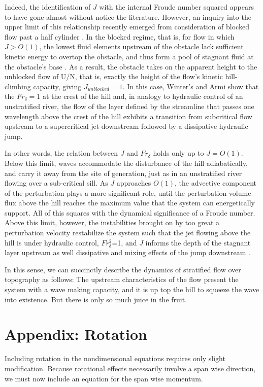 \documentclass[12pt]{article}
\begin{document}
	Indeed, the identification of $J$ with the internal Froude number squared appears to have gone almost without notice the literature. However, an inquiry into the upper limit of this relationship recently emerged from consideration of blocked flow past a half cylinder \citep{Winters2012}. In the blocked regime, that is, for flow in which $J>O(1)$, the lowest fluid elements upstream of the obstacle lack sufficient kinetic energy to overtop the obstacle, and thus form a pool of stagnant fluid at the obstacle's base \citep{Baines1995}. As a result, the obstacle takes on the apparent height to the unblocked flow of U/N, that is, exactly the height of the flow's kinetic hill-climbing capacity, giving $J_{unblocked}=1$. In this case, Winter's and Armi show that the $Fr_{\delta}=1$ at the crest of the hill and, in analogy to hydraulic control of an unstratified river, the flow of the layer defined by the streamline that passes one wavelength above the crest of the hill exhibits a transition from subcritical flow upstream to a supercritical jet downstream followed by a dissipative hydraulic jump. 
	
	In other words, the relation between $J$ and $Fr_{\delta}$ holds only up to $J=O(1)$. Below this limit, waves accommodate the disturbance of the hill adiabatically, and carry it away from the site of generation, just as in an unstratified river flowing over a sub-critical sill. As $J$ approaches $O(1)$, the advective component of the perturbation plays a more significant role, until the perturbation volume flux above the hill reaches the maximum value that the system can energetically support. All of this squares with the dynamical significance of a Froude number. Above this limit, however, the instabilities brought on by too great a perturbation velocity restabilize the system such that the jet flowing above the hill is under hydraulic control, $Fr_{\delta}^2$=1, and $J$ informs the depth of the stagnant layer upstream as well dissipative and mixing effects of the jump downstream \citep{Winters2012}. 
	
	In this sense, we can succinctly describe the dynamics of stratified flow over topography as follows: The upstream characteristics of the flow present the system with a wave making capacity, and it is up top the hill to squeeze the wave into existence. But there is only so much juice in the fruit. 
	
\section{Appendix: Rotation}
Including rotation in the nondimensional equations requires only slight modification. Because rotational effects necessarily involve a span wise direction, we must now include an equation for the span wise momentum. 
\end{document}
